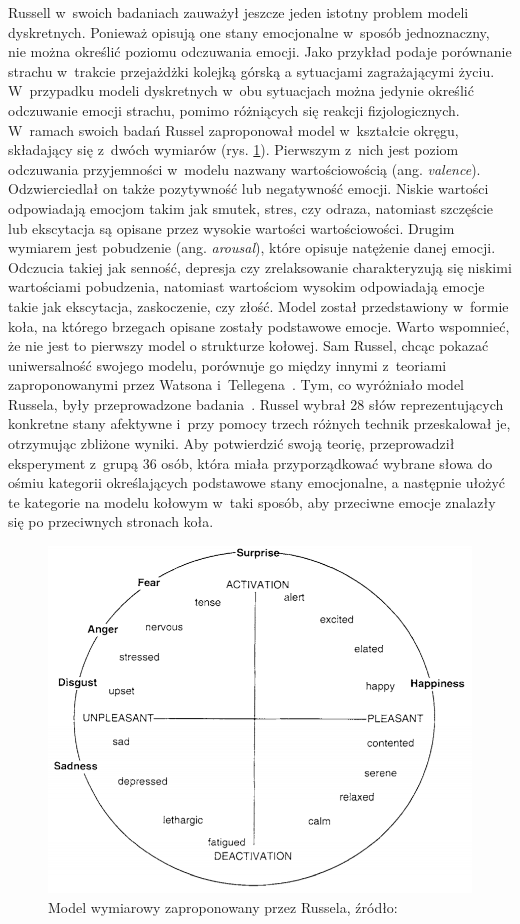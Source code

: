 Russell w~swoich badaniach zauważył jeszcze jeden istotny problem modeli dyskretnych. Ponieważ opisują one stany emocjonalne w~sposób jednoznaczny, nie można określić poziomu odczuwania emocji. Jako przykład podaje porównanie strachu w~trakcie przejażdżki kolejką górską a sytuacjami zagrażającymi życiu. W~przypadku modeli dyskretnych w~obu sytuacjach można jedynie określić odczuwanie emocji strachu, pomimo różniących się reakcji fizjologicznych. W~ramach swoich badań Russel zaproponował model w~kształcie okręgu, składający się z~dwóch wymiarów (rys. \ref{fig:circumplex}). Pierwszym z~nich jest poziom odczuwania przyjemności w~modelu nazwany wartościowością (ang. \textit{valence}). Odzwierciedlał on także pozytywność lub negatywność emocji. Niskie wartości odpowiadają emocjom takim jak smutek, stres, czy odraza, natomiast szczęście lub ekscytacja są opisane przez wysokie wartości wartościowości. Drugim wymiarem jest pobudzenie (ang. \textit{arousal}), które opisuje natężenie danej emocji. Odczucia takiej jak senność, depresja czy zrelaksowanie charakteryzują się niskimi wartościami pobudzenia, natomiast wartościom wysokim odpowiadają emocje takie jak ekscytacja, zaskoczenie, czy złość. Model został przedstawiony w~formie koła, na którego brzegach opisane zostały podstawowe emocje. Warto wspomnieć, że nie jest to pierwszy model o strukturze kołowej. Sam Russel, chcąc pokazać uniwersalność swojego modelu, porównuje go między innymi z~teoriami zaproponowanymi przez Watsona i~Tellegena~\cite{Watson_1985}. Tym, co wyróżniało model Russela, były przeprowadzone badania~\cite{circumplex_model_russel_1980}. Russel wybrał 28 słów reprezentujących konkretne stany afektywne i~przy pomocy trzech różnych technik przeskalował je, otrzymując zbliżone wyniki. Aby potwierdzić swoją teorię, przeprowadził eksperyment z~grupą 36 osób, która miała przyporządkować wybrane słowa do ośmiu kategorii określających podstawowe stany emocjonalne, a następnie ułożyć te kategorie na modelu kołowym w~taki sposób, aby przeciwne emocje znalazły się po przeciwnych stronach koła.

\begin{figure}[h]
	\centering
	\includegraphics[width=0.6\linewidth]{images/circumplex.png}
	\caption{Model wymiarowy zaproponowany przez Russela, źródło: \cite{russel_barret_core_affect}}
	\label{fig:circumplex}
\end{figure}

